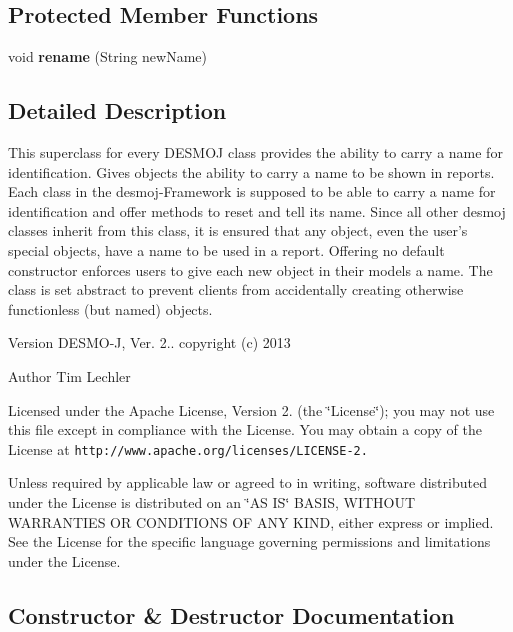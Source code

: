 \subsection*{Protected Member Functions}
\begin{DoxyCompactItemize}
\item 
void {\bf rename} (String new\-Name)
\end{DoxyCompactItemize}


\subsection{Detailed Description}
This superclass for every D\-E\-S\-M\-O\-J class provides the ability to carry a name for identification. Gives objects the ability to carry a name to be shown in reports. Each class in the desmoj-\/\-Framework is supposed to be able to carry a name for identification and offer methods to reset and tell its name. Since all other desmoj classes inherit from this class, it is ensured that any object, even the user's special objects, have a name to be used in a report. Offering no default constructor enforces users to give each new object in their models a name. The class is set abstract to prevent clients from accidentally creating otherwise functionless (but named) objects.

\begin{DoxyVersion}{Version}
D\-E\-S\-M\-O-\/\-J, Ver. 2.. copyright (c) 2013 
\end{DoxyVersion}
\begin{DoxyAuthor}{Author}
Tim Lechler
\end{DoxyAuthor}
Licensed under the Apache License, Version 2. (the \char`\"{}\-License\char`\"{}); you may not use this file except in compliance with the License. You may obtain a copy of the License at {\tt http\-://www.\-apache.\-org/licenses/\-L\-I\-C\-E\-N\-S\-E-\/2.}

Unless required by applicable law or agreed to in writing, software distributed under the License is distributed on an \char`\"{}\-A\-S I\-S\char`\"{} B\-A\-S\-I\-S, W\-I\-T\-H\-O\-U\-T W\-A\-R\-R\-A\-N\-T\-I\-E\-S O\-R C\-O\-N\-D\-I\-T\-I\-O\-N\-S O\-F A\-N\-Y K\-I\-N\-D, either express or implied. See the License for the specific language governing permissions and limitations under the License. 

\subsection{Constructor \& Destructor Documentation}
